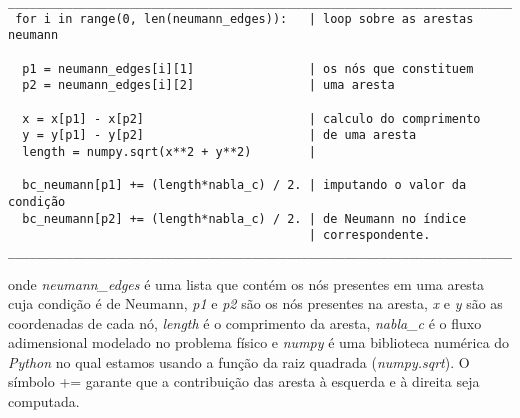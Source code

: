 \begin{verbatim}
__________________________________________________________________________
 for i in range(0, len(neumann_edges)):   | loop sobre as arestas neumann
 
  p1 = neumann_edges[i][1]                | os nós que constituem
  p2 = neumann_edges[i][2]                | uma aresta

  x = x[p1] - x[p2]                       | calculo do comprimento
  y = y[p1] - y[p2]                       | de uma aresta
  length = numpy.sqrt(x**2 + y**2)        | 

  bc_neumann[p1] += (length*nabla_c) / 2. | imputando o valor da condição
  bc_neumann[p2] += (length*nabla_c) / 2. | de Neumann no índice
                                          | correspondente.
__________________________________________________________________________

\end{verbatim}

\noindent
onde \textit{neumann\_edges} é uma lista que contém os nós presentes em
uma aresta cuja condição é de Neumann, \textit{p1} e \textit{p2} são os nós 
presentes na aresta, \textit{x} e \textit{y} são as coordenadas de cada nó,
\textit{length} é o comprimento da aresta, \textit{nabla\_c} é o fluxo
adimensional modelado no problema físico e \textit{numpy} é uma biblioteca
numérica do \textit{Python} no qual estamos usando a função da raiz
quadrada (\textit{numpy.sqrt}).
O símbolo += garante que a contribuição das aresta à esquerda e
à direita seja computada.
               
